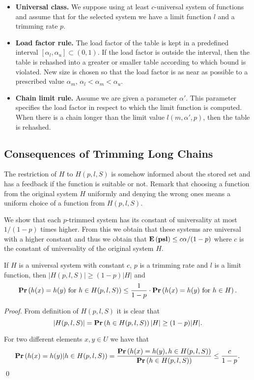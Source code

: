\begin{itemize}
\item \textbf{Universal class.} We suppose using at least $c$-universal system of functions and assume that for the selected system we have a limit function $l$ and a trimming rate $p$.

\item \textbf{Load factor rule.} The load factor of the table is kept in a predefined interval $[\alpha_l, \alpha_u] \subset (0, 1)$. If the load factor is outside the interval, then the table is rehashed into a greater or smaller table according to which bound is violated. New size is chosen so that the load factor is as near as possible to a prescribed value $\alpha_m$, $\alpha_l < \alpha_m < \alpha_u$. 

\item \textbf{Chain limit rule.} Assume we are given a parameter $\alpha'$. This parameter specifies the load factor in respect to which the limit function is computed. When there is a chain longer than the limit value $l(m, \alpha', p)$, then the table is rehashed.
\end{itemize}

% 

\subsection{Consequences of Trimming Long Chains}
The restriction of $H$ to $H(p, l, S)$ is somehow informed about the stored set and has a feedback if the function is suitable or not. Remark that choosing a function from the original system $H$ uniformly and denying the wrong ones means a uniform choice of a function from $H(p, l, S)$.

We show that each $p$-trimmed system has its constant of universality at most $1 / (1 - p)$ times higher. From this we obtain that these systems are universal with a higher constant and thus we obtain that $\mathbf{E}\left(\mathbf{psl}\right) \leq c\alpha/(1-p)$ where $c$ is the constant of universality of the original system $H$.

\begin{lemma}
\label{lemma-trimmed-system}
If $H$ is a universal system with constant $c$, $p$ is a trimming rate and $l$ is a limit function, then $|H(p, l, S)| \geq (1 - p)|H|$ and  \[ \mathbf{Pr}\left(h(x) = h(y) \mbox{ for } h \in H(p, l, S)\right) \leq \frac{1}{1 - p} \cdot \mathbf{Pr}\left(h(x) = h(y) \mbox{ for } h \in H\right). \]
\end{lemma}
\begin{proof}
From definition of $H(p, l, S)$ it is clear that \[|H(p, l, S)| = \mathbf{Pr}\left(h \in H(p, l, S)\right)|H| \geq (1 - p)|H|.\]

For two different elements $x, y \in U$ we have that
\[\mathbf{Pr}\left(h(x) = h(y) | h \in H(p, l, S)\right) = \frac{\mathbf{Pr}\left(h(x) = h(y), h \in H(p, l, S)\right)}{\mathbf{Pr}\left(h \in H(p, l, S)\right)} \leq \frac{c}{1 - p}.\]
\qed
\end{proof}

